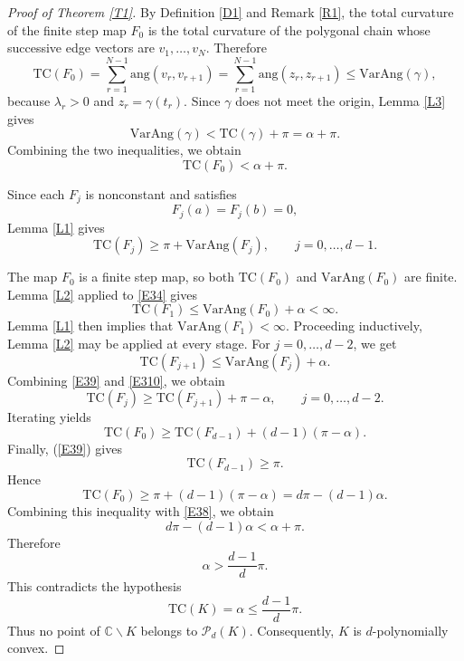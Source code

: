 \documentclass[10pt,a4paper]{amsart}
\newcommand{\C}{\mathbb{C}}
\newcommand{\ang}{\mathrm{ang}}
\newcommand{\T}{\mathrm{TC}}
\newcommand{\VA}{\mathrm{VarAng}}
\newcommand{\cP}{\mathcal{P}}
\numberwithin{equation}{section}
\begin{document}
\begin{proof}[Proof of Theorem \ref{T1}]
By Definition \ref{D1} and Remark \ref{R1}, the total curvature of the finite step map $F_0$ is the total curvature of the polygonal chain whose successive edge vectors are $v_1,\ldots,v_N.$
Therefore
\begin{equation*}\T(F_0)=\sum_{r=1}^{N-1}\ang(v_r,v_{r+1})=\sum_{r=1}^{N-1}\ang(z_r,z_{r+1})\le\VA(\gamma),
\end{equation*}
because $\lambda_r>0$ and $z_r=\gamma(t_r)$. Since $\gamma$ does not meet the origin, Lemma \ref{L3} gives
\begin{equation*}\VA(\gamma)<\T(\gamma)+\pi=\alpha+\pi.    
\end{equation*}
Combining the two inequalities, we obtain
\begin{equation}\T(F_0)<\alpha+\pi.
    \label{E38}
\end{equation}

Since each $F_j$ is nonconstant and satisfies
\[F_j(a)=F_j(b)=0,\]
Lemma \ref{L1} gives
\begin{equation} \T(F_j)\ge \pi+\VA(F_j),\qquad j=0,\ldots,d-1.
    \label{E39}
\end{equation}

The map $F_0$ is a finite step map, so both $\T(F_0)$ and $\VA(F_0)$ are finite. Lemma \ref{L2} applied to \eqref{E34} gives
\[\T(F_1)\le\VA(F_0)+\alpha<\infty.\]
Lemma \ref{L1} then implies that $\VA(F_1)<\infty$. Proceeding inductively, Lemma \ref{L2} may be applied at every stage. For $j=0,\ldots,d-2$, we get
\begin{equation}\T(F_{j+1})\le\VA(F_j)+\alpha.
    \label{E310}
\end{equation}
Combining \eqref{E39} and
\eqref{E310}, we obtain
\begin{equation*} \T(F_j) \ge \T(F_{j+1})+\pi-\alpha,\qquad j=0,\ldots,d-2.
\end{equation*}
Iterating yields
\[\T(F_0)\ge \T(F_{d-1})+(d-1)(\pi-\alpha).
\]
Finally, (\ref{E39}) gives
\[\T(F_{d-1})\geq\pi.\]
Hence
\begin{equation*}
    \T(F_0)\ge \pi+(d-1)(\pi-\alpha)=d\pi-(d-1)\alpha.
   \end{equation*}
Combining this inequality with \eqref{E38}, we obtain
\[d\pi-(d-1)\alpha < \alpha+\pi.
\]
Therefore
\[\alpha>\frac{d-1}{d}\pi.
\]
This contradicts the hypothesis
\[\T(K)=\alpha\le\frac{d-1}{d}\pi.\]
Thus no point of $\C\backslash K$ belongs to $\cP_d(K)$. Consequently, $K$ is $d$-polynomially convex.
\end{proof}
\end{document}
